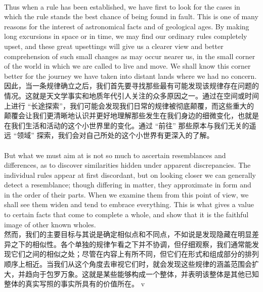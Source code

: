 \documentclass{article}
\begin{document}
\\
Thus when a rule has been established, we have first to look for the cases in which the rule stands the best chance of being found in fault. This is one of many reasons for the interest of astronomical facts and of geological ages. By making long excursions in space or in time, we may find our ordinary rules completely upset, and these great upsettings will give us a clearer view and better comprehension of such small changes as may occur nearer us, in the small corner of the world in which we are called to live and move. We shall know this corner better for the journey we have taken into distant lands where we had no concern.\\
因此，当一条规律确立之后，我们首先要寻找那些最有可能发现该规律存在问题的情况。这就是天文学事实和地质年代引人关注的众多原因之一。通过在空间或时间上进行 “长途探索”，我们可能会发现我们日常的规律被彻底颠覆，而这些重大的颠覆会让我们更清晰地认识并更好地理解那些发生在我们身边的细微变化，也就是在我们生活和活动的这个小世界里的变化。通过 “前往” 那些原本与我们无关的遥远 “领域” 探索，我们会对自己所处的这个小世界有更深入的了解。 \\

\\
But what we must aim at is not so much to ascertain resemblances and differences, as to discover similarities hidden under apparent discrepancies. The individual rules appear at first discordant, but on looking closer we can generally detect a resemblance; though differing in matter, they approximate in form and in the order of their parts. When we examine them from this point of view, we shall see them widen and tend to embrace everything. This is what gives a value to certain facts that come to complete a whole, and show that it is the faithful image of other known wholes.\\
然而，我们的主要目标与其说是确定相似点和不同点，不如说是发现隐藏在明显差异之下的相似性。各个单独的规律乍看之下并不协调，但仔细观察，我们通常能发现它们之间的相似之处；尽管在内容上有所不同，但它们在形式和组成部分的排列顺序上相近。当我们从这个角度去审视它们时，就会发现这些规律的涵盖范围会扩大，并趋向于包罗万象。这就是某些能够构成一个整体，并表明该整体是其他已知整体的真实写照的事实所具有的价值所在。 v
\end{document}
